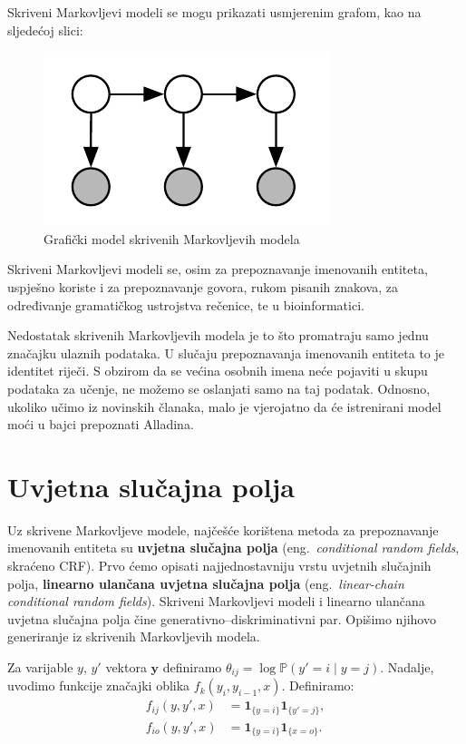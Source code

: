 \documentclass[a4paper,twoside,12pt]{memoir} %
\newcommand{\ti}[1]{\textit{#1\/}}
\newcommand{\tb}{\textbf}
\begin{document}
	Skriveni Markovljevi modeli se mogu prikazati usmjerenim grafom, kao na sljedećoj slici:

	\vspace*{-6pt}
	\begin{figure}[H]
		\centering
		\includegraphics[scale = 0.5]{hmm.png}
		\caption{Grafički model skrivenih Markovljevih modela}
	\end{figure}

	Skriveni Markovljevi modeli se, osim za prepoznavanje imenovanih entiteta, uspješno koriste i za prepoznavanje govora, rukom pisanih znakova, za određivanje gramatičkog ustrojstva rečenice, te u bioinformatici.

	Nedostatak skrivenih Markovljevih modela je to što promatraju samo jednu značajku ulaznih podataka. U slučaju prepoznavanja imenovanih entiteta to je identitet riječi. S obzirom da se većina osobnih imena neće pojaviti u skupu podataka za učenje, ne možemo se oslanjati samo na taj podatak. Odnosno, ukoliko učimo iz novinskih članaka, malo je vjerojatno da će istrenirani model moći u bajci prepoznati Alladina.


	\section{Uvjetna slučajna polja}

	Uz skrivene Markovljeve modele, najčešće korištena metoda za prepoznavanje imenovanih entiteta su \tb{uvjetna slučajna polja} (eng.~\ti{conditional random fields}, skraćeno CRF\@). Prvo ćemo opisati najjednostavniju vrstu uvjetnih slučajnih polja, \tb{linearno ulančana uvjetna slučajna polja} (eng.~\ti{linear-chain conditional random fields}). Skriveni Markovljevi modeli i linearno ulančana uvjetna slučajna polja čine generativno--diskriminativni par. Opišimo njihovo generiranje iz skrivenih Markovljevih modela.

	\bigskip

	Za varijable $y$, $y'$ vektora $\mathbf{y}$ definiramo $\theta_{ij} = \log \mathbb{P}(y' = i \mid y = j)$. Nadalje, uvodimo funkcije značajki oblika $f_k(y_i, y_{i-1}, x)$. Definiramo:
	\begin{equation*}
	\begin{split}
	f_{ij}(y, y', x) &= \mathbf{1}_{\{y=i\}} \mathbf{1}_{\{y'=j\}}, \\[3pt]
	f_{io}(y, y', x) &= \mathbf{1}_{\{y=i\}} \mathbf{1}_{\{x=o\}}.
	\end{split}
	\end{equation*}
\end{document}
